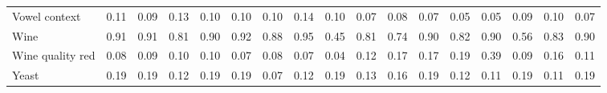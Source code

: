 \documentclass[preprint,12pt]{elsarticle}
\begin{document}
\begin{landscape}
\begin{table}[h!]
{\begin{tabular}{l c ccc ccc ccc ccc ccc}
Vowel context & 0.11 & 0.09 & 0.13 & 0.10 & 0.10 & 0.10 & 0.14 & 0.10 & 0.07 & 0.08 & 0.07 & 0.05 & 0.05 & 0.09 & 0.10 & 0.07 \\
Wine & 0.91 & 0.91 & 0.81 & 0.90 & 0.92 & 0.88 & 0.95 & 0.45 & 0.81 & 0.74 & 0.90 & 0.82 & 0.90 & 0.56 & 0.83 & 0.90 \\
Wine quality red & 0.08 & 0.09 & 0.10 & 0.10 & 0.07 & 0.08 & 0.07 & 0.04 & 0.12 & 0.17 & 0.17 & 0.19 & 0.39 & 0.09 & 0.16 & 0.11 \\
Yeast & 0.19 & 0.19 & 0.12 & 0.19 & 0.19 & 0.07 & 0.12 & 0.19 & 0.13 & 0.16 & 0.19 & 0.12 & 0.11 & 0.19 & 0.11 & 0.19 \\
\bottomrule
\end{tabular}
}
\end{table}
\end{landscape}
\end{document}
